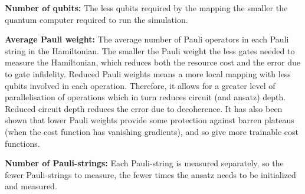 \documentclass[twoside]{article}
\begin{document}
\begin{romanlist}
\item \textbf{Number of qubits:} The less qubits required by the mapping the smaller the quantum computer required to run the simulation.
\item \textbf{Average Pauli weight:} The average number of Pauli operators in each Pauli string in the Hamiltonian. The smaller the Pauli weight the less gates needed to measure the Hamiltonian, which reduces both the resource cost and the error due to gate infidelity. Reduced Pauli weights means a more local mapping with less qubits involved in each operation. Therefore, it allows for a greater level of parallelisation of operations which in turn reduces circuit (and ansatz) depth. Reduced circuit depth reduces the error due to decoherence. It has also been shown \cite{barrenplat} that lower Pauli weights provide some protection against barren plateaus (when the cost function has vanishing gradients), and so give more trainable cost functions. 
\item \textbf{Number of Pauli-strings:} Each Pauli-string is measured separately, so the fewer Pauli-strings to measure, the fewer times the ansatz needs to be initialized and measured.
\end{romanlist}
\end{document}
